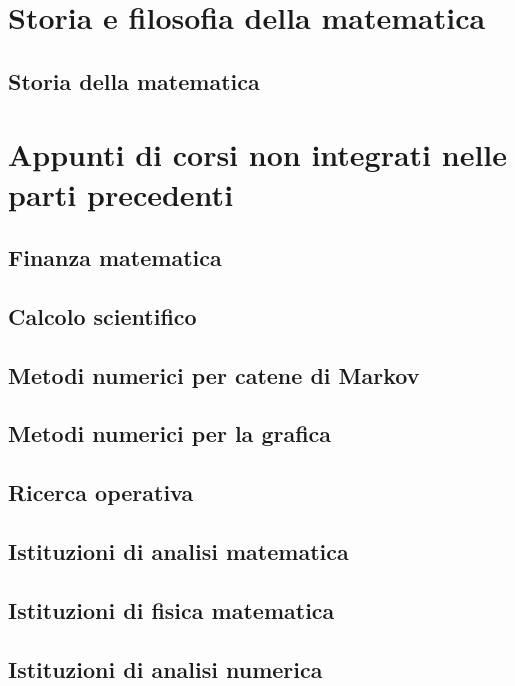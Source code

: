 \documentclass{book}
\begin{document}
	\part{Storia e filosofia della matematica}
	\chapter{Storia della matematica}
	
	\part{Appunti di corsi non integrati nelle parti precedenti}
	\chapter{Finanza matematica}
	
	\chapter{Calcolo scientifico}
	
	\chapter{Metodi numerici per catene di Markov}
	
	\chapter{Metodi numerici per la grafica}
	
	\chapter{Ricerca operativa}
	
	\chapter{Istituzioni di analisi matematica}
	
	\chapter{Istituzioni di fisica matematica}
	
	\chapter{Istituzioni di analisi numerica}
	
\end{document}

